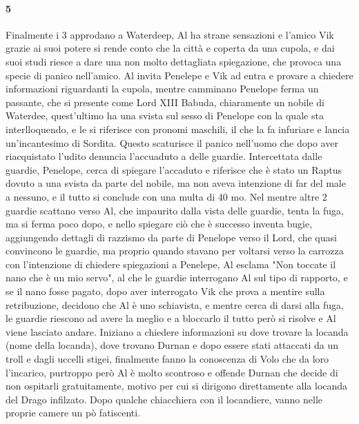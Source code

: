\documentclass{article}
\begin{document}
                  \paragraph{5} Finalmente i 3 approdano a Waterdeep, Al ha strane sensazioni e l'amico Vik grazie ai suoi potere si rende conto che la città e coperta da una cupola, e dai suoi studi riesce a dare una non molto dettagliata spiegazione, che provoca una specie di panico nell'amico. Al invita Penelepe e Vik ad entra e provare a chiedere informazioni riguardanti la cupola, mentre camminano Penelope ferma un passante, che si presente come Lord XIII Babuda, chiaramente un nobile di Waterdee, quest'ultimo ha una svista sul sesso di Penelope con la quale sta interlloquendo, e le si riferisce con pronomi maschili, il che la fa infuriare e lancia un'incantesimo di Sordita. Questo scaturisce il panico nell'uomo che dopo aver riacquistato l'udito denuncia l'accuaduto a delle guardie. Intercettata dalle guardie, Penelope, cerca di spiegare l'accaduto e riferisce che è stato un Raptus dovuto a una svista da parte del nobile, ma non aveva intenzione di far del male a nessuno, e il tutto si conclude con una multa di 40 mo. Nel mentre altre 2 guardie scattano verso Al, che impaurito dalla vista delle guardie, tenta la fuga, ma si ferma poco dopo, e nello spiegare ciò che è successo inventa bugie, aggiungendo dettagli di razzismo da parte di Penelope verso il Lord,  che quasi convincono le guardie, ma proprio quando stavano per voltarsi verso la carrozza con l'intenzione di chiedere spiegazioni a Penelepe, Al esclama "Non toccate il nano che è un mio servo", al che le guardie interrogano Al sul tipo di rapporto, e se il nano fosse pagato, dopo aver interrogato Vik che prova a mentire sulla retribuzione, decidono che Al è uno schiavista, e mentre cerca di darsi alla fuga, le guardie riescono ad avere la meglio e a bloccarlo il tutto però si risolve e Al viene lasciato andare. Iniziano a chiedere informazioni su dove trovare la locanda (nome della locanda), dove trovano Durnan e dopo essere stati attaccati da un troll e dagli uccelli stigei, finalmente fanno la conoscenza di Volo che da loro l'incarico, purtroppo però Al è molto scontroso e offende Durnan che decide di non ospitarli gratuitamente, motivo per cui si dirigono direttamente alla locanda del Drago infilzato. Dopo qualche chiacchiera con il locandiere, vanno nelle proprie camere un pò fatiscenti. 
\end{document}
